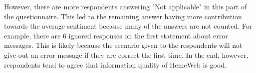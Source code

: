 However, there are more respondents answering "Not applicable" in this part of the questionnaire. This led to the remaining answer having more contribution towards the average sentiment because many of the answers are not counted. For example, there are 6 ignored responses on the first statement about error messages. This is likely because the scenario given to the respondents will not give out an error message if they are correct the first time.  In the end, however, respondents tend to agree that information quality of HemeWeb is good.




\begin{center}
\label{table:overall-interface-quality}
\end{center}
\vspace{0.5cm}


